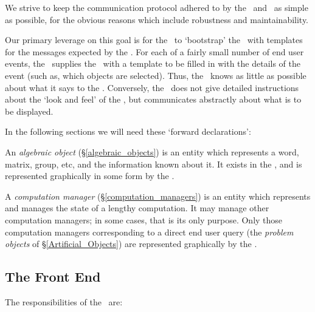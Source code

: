 We strive to keep the communication protocol adhered to by the \SM\
and \FE\ as simple as possible, for the obvious reasons which include
robustness and maintainability.

Our primary leverage on this goal is for the \SM\ to `bootstrap' the
\FE\ with templates for the messages expected by the \SM. For each of
a fairly small number of end user events, the \SM\ supplies the \FE\
with a template to be filled in with the details of the event (such
as, which objects are selected). Thus, the \FE\ knows as little as
possible about what it says to the \SM. Conversely, the \SM\ does not
give detailed instructions about the `look and feel' of the \FE, but
communicates abstractly about what is to be displayed.

In the following sections we will need these `forward declarations':

An {\em algebraic object} (\S\ref{algebraic_objects}) is an entity
which represents a word, matrix, group, etc, and the information known
about it. It exists in the \SM, and is represented graphically in some
form by the \FE.

A {\em computation manager} (\S\ref{computation_managers}) is an
entity which represents and manages the state of a lengthy
computation. It may manage other computation managers; in some cases,
that is its only purpose. Only those computation managers
corresponding to a direct end user query (the {\em problem objects} of
\S\ref{Artificial_Objects}) are represented graphically by the \FE.


\subsection{The Front End}

The responsibilities of the \FE\ are:

